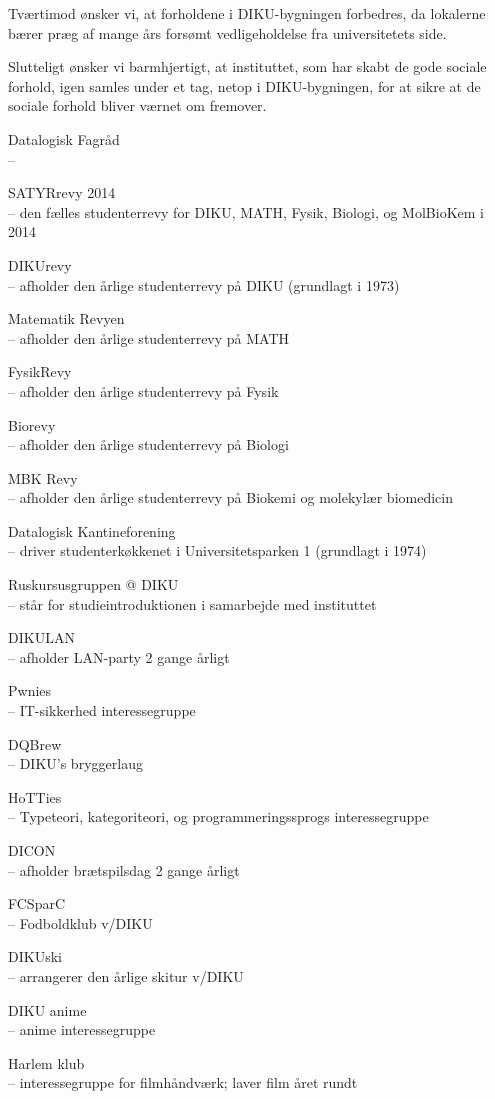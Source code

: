 \documentclass[a4paper]{article}
\begin{document}
Tværtimod ønsker vi, at forholdene i DIKU-bygningen forbedres, da lokalerne
bærer præg af mange års forsømt vedligeholdelse fra universitetets side.

Slutteligt ønsker vi barmhjertigt, at instituttet, som har skabt de gode
sociale forhold, igen samles under et tag, netop i DIKU-bygningen, for at sikre
at de sociale forhold bliver værnet om fremover.

\begin{flushright}

\footnotesize\sffamily\itshape

Datalogisk Fagråd \\
--

SATYRrevy 2014 \\
-- den fælles studenterrevy for DIKU, MATH, Fysik, Biologi, og MolBioKem i 2014

DIKUrevy \\
-- afholder den årlige studenterrevy på DIKU (grundlagt i 1973)

Matematik Revyen \\
-- afholder den årlige studenterrevy på MATH

FysikRevy \\
-- afholder den årlige studenterrevy på Fysik

Biorevy \\
-- afholder den årlige studenterrevy på Biologi

MBK Revy \\
-- afholder den årlige studenterrevy på Biokemi og molekylær biomedicin

Datalogisk Kantineforening \\
-- driver studenterkøkkenet i Universitetsparken 1 (grundlagt i 1974)

Ruskursusgruppen @ DIKU \\
-- står for studieintroduktionen i samarbejde med instituttet

DIKULAN \\
-- afholder LAN-party 2 gange årligt

Pwnies \\
-- IT-sikkerhed interessegruppe

DQBrew \\
-- DIKU's bryggerlaug

HoTTies \\
-- Typeteori, kategoriteori, og programmeringssprogs interessegruppe

DICON \\
-- afholder brætspilsdag 2 gange årligt

FCSparC \\
-- Fodboldklub v/DIKU

DIKUski \\
-- arrangerer den årlige skitur v/DIKU

DIKU anime \\
-- anime interessegruppe

Harlem klub \\
-- interessegruppe for filmhåndværk;  laver film året rundt

\end{flushright}
\end{document}
